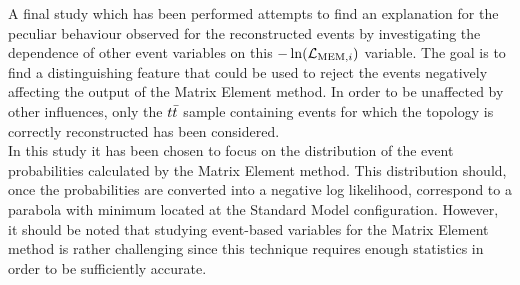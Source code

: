 A final study which has been performed attempts to find an explanation for the peculiar behaviour observed for the reconstructed events by investigating the dependence of other event variables on this $-\ln(\mathcal{L}_{\textrm{MEM}, i})$ variable.
The goal is to find a distinguishing feature that could be used to reject the events negatively affecting the output of the Matrix Element method.
In order to be unaffected by other influences, only the $t\bar{t}$ sample containing events for which the topology is correctly reconstructed has been considered.
\\
In this study it has been chosen to focus on the distribution of the event probabilities calculated by the Matrix Element method.
This distribution should, once the probabilities are converted into a negative log likelihood, correspond to a parabola with minimum located at the Standard Model configuration.
However, it should be noted that studying event-based variables for the Matrix Element method is rather challenging since this technique requires enough statistics in order to be sufficiently accurate.
\\

